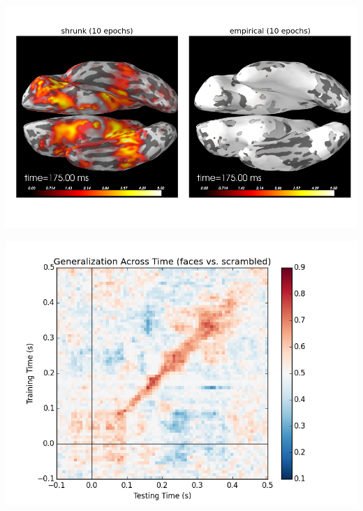 \documentclass[t,11pt,compress]{beamer} %
\begin{document}
\begin{frame}[plain,t,c]
\begin{minipage}{1.09\linewidth}
\hspace{.4em}%
\begin{minipage}{.305\linewidth}
    \includegraphics[width=\linewidth]{covariance_whitening_hbm.png}%
\end{minipage}
\hspace{-1.0em}%
\begin{minipage}{.22\linewidth}
    \includegraphics[width=\linewidth]{time_gen.png}%
\end{minipage}
\vspace{1em}%
\end{minipage}
\smallskip
~
\end{frame}
\end{document}
